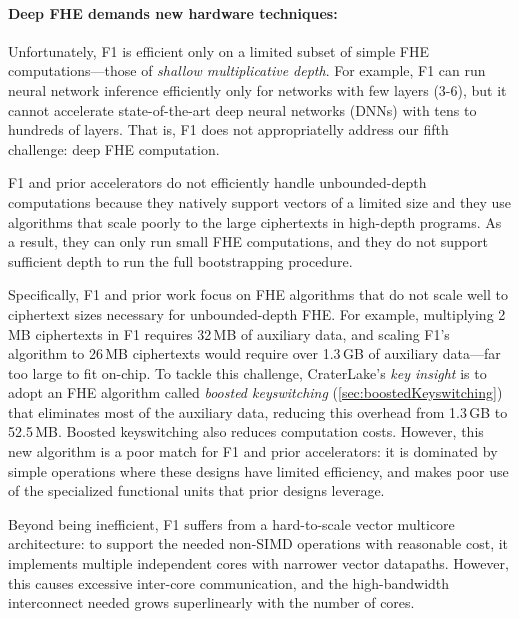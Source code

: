 \paragraph{Deep FHE demands new hardware techniques:}
Unfortunately, F1 is efficient only on a limited subset of simple FHE
computations---those of \emph{shallow multiplicative depth}. For example, F1
can run neural network inference efficiently only for networks with few layers
(3-6), but it cannot accelerate state-of-the-art deep neural networks (DNNs)
with tens to hundreds of layers. That is, F1 does not appropriatelly address
our fifth challenge: deep FHE computation.

F1 and prior accelerators do not efficiently handle unbounded-depth
computations because they natively support vectors of a limited size and they
use algorithms that scale poorly to the large ciphertexts in high-depth
programs. As a result, they can only run small FHE computations, and they do
not support sufficient depth to run the full bootstrapping procedure.

Specifically, F1 and prior work focus on FHE algorithms that do not scale well
to ciphertext sizes necessary for unbounded-depth FHE. For example, multiplying
2\,MB ciphertexts in F1 requires 32\,MB of auxiliary data, and scaling F1's
algorithm to 26\,MB ciphertexts would require over 1.3\,GB of auxiliary
data---far too large to fit on-chip. To tackle this challenge, CraterLake's
\emph{key insight} is to adopt an FHE algorithm called \emph{boosted
keyswitching} (\autoref{sec:boostedKeyswitching}) that eliminates most of the
auxiliary data, reducing this overhead from 1.3\,GB to 52.5\,MB. Boosted
keyswitching also reduces computation costs. However, this new algorithm is a
poor match for F1 and prior accelerators: it is dominated by simple operations
where these designs have limited efficiency, and makes poor use of the
specialized functional units that prior designs leverage.

Beyond being inefficient, F1 suffers from a hard-to-scale vector multicore
architecture: to support the needed non-SIMD operations with reasonable cost,
it implements multiple independent cores with narrower vector datapaths.
However, this causes excessive inter-core communication, and the high-bandwidth
interconnect needed grows superlinearly with the number of cores.

